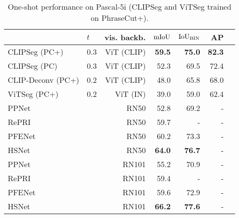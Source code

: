 \begin{table}[t]
    \centering
    \footnotesize
    \begin{tabular}{llrrrrr}
         \toprule
        & $t$ & vis. backb. & $\text{mIoU}$ & $\text{IoU}_{\text{BIN}}$ &  AP \\
        \midrule
CLIPSeg (PC+) & 0.3 & ViT (CLIP) & \textbf{59.5} & \textbf{75.0} & \textbf{82.3} \\
CLIPSeg (PC)  & 0.3 & ViT (CLIP) & 52.3 & 69.5 & 72.4 \\
CLIP-Deconv (PC+) & 0.2 & ViT (CLIP) & 48.0 & 65.8 & 68.0 \\
ViTSeg (PC+) & 0.2 & ViT (IN) & 39.0 & 59.0 & 62.4 \\
        \midrule
        PPNet  \cite{liu20} & & RN50 & 52.8  & 69.2  & - \\
        RePRI \cite{boudiaf20} & & RN50 & 59.7 & - & -  \\
        PFENet \cite{tian20a} & & RN50 & 60.2  & 73.3 & -  \\
        HSNet \cite{min21hsnet} & & RN50 & \textbf{64.0} & \textbf{76.7} & -\\
        \midrule
        PPNet  \cite{liu20} & & RN101 & 55.2  & 70.9 & -  \\
        RePRI \cite{boudiaf20} & & RN101  & 59.4  & - & - \\
        PFENet \cite{tian20a} & & RN101 & 59.6 & 72.9 & - \\
        HSNet \cite{min21hsnet} & & RN101 & \textbf{66.2} & \textbf{77.6} & - \\
        \bottomrule
         \end{tabular} %
    \caption{One-shot performance on Pascal-5i (CLIPSeg and ViTSeg trained on PhraseCut+).}
    \label{tab:pas5i_oneshot}
\end{table}

